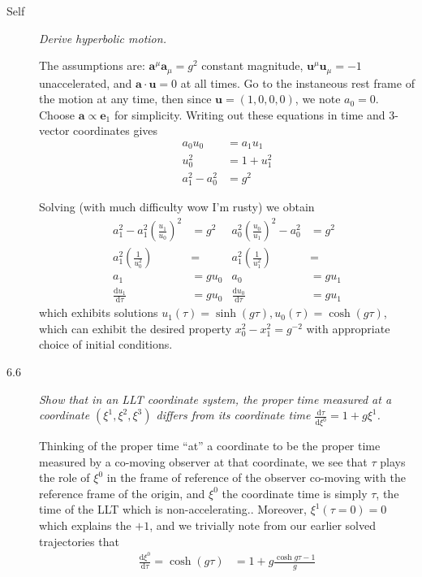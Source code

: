 \documentclass[12pt]{report}
\newcommand{\rd}[2]{\frac{\mathrm{d}#1}{\mathrm{d}#2}}
\newcommand{\bm}[1]{\boldsymbol{\mathbf{#1}}}
\begin{document}
\begin{description}
    \item[Self] \emph{Derive hyperbolic motion.}

        The assumptions are: $\bm{a}^\mu\bm{a}_\mu = g^2$ constant
        magnitude, $\bm{u}^\mu\bm{u}_\mu = -1$ unaccelerated, and
        $\bm{a} \cdot \bm{u} = 0$ at all times. Go to the instaneous
        rest frame of the motion at any time, then since $\bm{u} = (1, 0, 0,
        0)$, we note $a_0 = 0$. Choose $\bm{a} \propto \bm{e}_1$ for
        simplicity. Writing out these equations in time and 3-vector coordinates
        gives
        \begin{align*}
            a_0u_0 &= a_1u_1\\
            u_0^2 &= 1 + u_1^2\\
            a_1^2 - a_0^2 &= g^2
        \end{align*}

        Solving (with much difficulty wow I'm rusty) we obtain
        \begin{align*}
            a_1^2 - a_1^2\left( \frac{u_1}{u_0} \right)^2 &= g^2 &
            a_0^2\left( \frac{u_0}{u_1} \right)^2 - a_0^2 &= g^2\\
            a_1^2\left( \frac{1}{u_0^2} \right) &=&
            a_1^2\left( \frac{1}{u_1^2} \right) &=\\
            a_1 &= gu_0&
            a_0 &= gu_1\\
            \rd{u_1}{\tau} &= gu_0 &
            \rd{u_0}{\tau} &= gu_1
        \end{align*}
        which exhibits solutions $u_1(\tau) = \sinh(g\tau), u_0(\tau) =
        \cosh(g\tau)$, which can  exhibit the desired property $x_0^2 - x_1^2 =
        g^{-2}$ with appropriate choice of initial conditions.

    \item[6.6] \emph{Show that in an LLT coordinate system, the proper time
        measured at a coordinate $(\xi^1, \xi^2, \xi^3)$ differs from its
        coordinate time $\rd{\tau}{\xi^0} = 1 + g\xi^1$.}

        Thinking of the proper time ``at'' a coordinate to be the proper time
        measured by a co-moving observer at that coordinate, we see that $\tau$
        plays the role of $\xi^0$ in the frame of reference of the observer
        co-moving with the reference frame of the origin, and $\xi^0$ the
        coordinate time is simply $\tau$, the time of the LLT which is
        non-accelerating.. Moreover, $\xi^1(\tau=0) = 0$ which explains the
        $+1$, and we trivially note from our earlier solved trajectories that
        \begin{align*}
            \rd{\xi^0}{\tau} = \cosh(g\tau) &= 1 + g\frac{\cosh g\tau - 1}{g}
        \end{align*}


\end{description}
\end{document}
